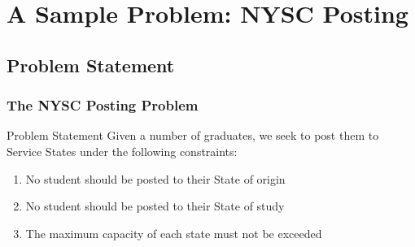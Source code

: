\documentclass[10pt]{beamer}
\begin{document}
	\section{A Sample Problem: NYSC Posting}
		\subsection{Problem Statement}
			\begin{frame}
				\frametitle{The NYSC Posting Problem}
				\begin{block}{Problem Statement}
					Given a number of graduates, we seek to post them to Service States under the following constraints:
					\begin{enumerate}
						\item No student should be posted to their State of origin
						\item No student should be posted to their State of study
						\item The maximum capacity of each state must not be exceeded%
					\end{enumerate}
				\end{block}		
			\end{frame}
\end{document}
